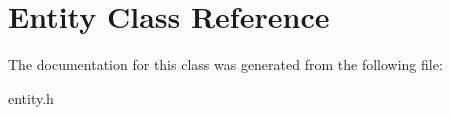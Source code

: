 \hypertarget{class_entity}{}\section{Entity Class Reference}
\label{class_entity}


The documentation for this class was generated from the following file\+:\begin{DoxyCompactItemize}
\item 
entity.\+h\end{DoxyCompactItemize}
